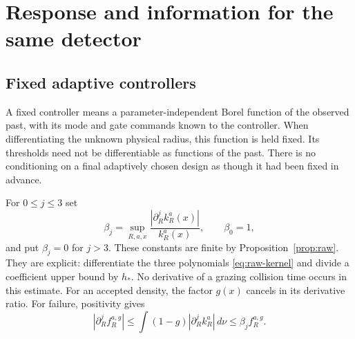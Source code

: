 \section{Response and information for the same detector}\label{sec:response}
\subsection{Fixed adaptive controllers}
A fixed controller means a parameter-independent Borel function of the
observed past, with its mode and gate commands known to the controller.
When differentiating the unknown physical radius, this function is held
fixed. Its thresholds need not be differentiable as functions of the past.
There is no conditioning on a final adaptively chosen design as though it
had been fixed in advance.

For $0\le j\le3$ set
\[
 \beta_j=\sup_{R,a,x}\frac{|\partial_R^jk_R^a(x)|}{k_R^a(x)},
 \qquad \beta_0=1,
\]
and put $\beta_j=0$ for $j>3$. These constants are finite by
Proposition~\ref{prop:raw}. They are explicit: differentiate the three
polynomials \eqref{eq:raw-kernel} and divide a coefficient upper bound by
$h_*$. No derivative of a grazing collision time occurs in this estimate.
For an accepted density, the factor $g(x)$ cancels in its derivative ratio.
For failure, positivity gives
\[
 |\partial_R^jf_R^{a,g}|
 \le\int (1-g)|\partial_R^jk_R^a|\,d\nu\le\beta_j f_R^{a,g}.
\]


